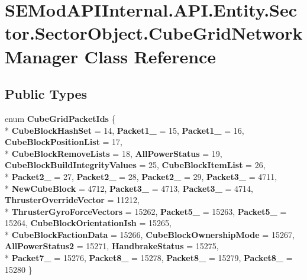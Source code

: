 \hypertarget{class_s_e_mod_a_p_i_internal_1_1_a_p_i_1_1_entity_1_1_sector_1_1_sector_object_1_1_cube_grid_network_manager}{}\section{S\+E\+Mod\+A\+P\+I\+Internal.\+A\+P\+I.\+Entity.\+Sector.\+Sector\+Object.\+Cube\+Grid\+Network\+Manager Class Reference}
\label{class_s_e_mod_a_p_i_internal_1_1_a_p_i_1_1_entity_1_1_sector_1_1_sector_object_1_1_cube_grid_network_manager}
\subsection*{Public Types}
\begin{DoxyCompactItemize}
\item 
\hypertarget{class_s_e_mod_a_p_i_internal_1_1_a_p_i_1_1_entity_1_1_sector_1_1_sector_object_1_1_cube_grid_network_manager_a07ca7bcff0f2ff2d4fb36f4a7c3a887d}{}enum {\bfseries Cube\+Grid\+Packet\+Ids} \{ \\*
{\bfseries Cube\+Block\+Hash\+Set} = 14, 
{\bfseries Packet1\+\_} = 15, 
{\bfseries Packet1\+\_} = 16, 
{\bfseries Cube\+Block\+Position\+List} = 17, 
\\*
{\bfseries Cube\+Block\+Remove\+Lists} = 18, 
{\bfseries All\+Power\+Status} = 19, 
{\bfseries Cube\+Block\+Build\+Integrity\+Values} = 25, 
{\bfseries Cube\+Block\+Item\+List} = 26, 
\\*
{\bfseries Packet2\+\_} = 27, 
{\bfseries Packet2\+\_} = 28, 
{\bfseries Packet2\+\_} = 29, 
{\bfseries Packet3\+\_} = 4711, 
\\*
{\bfseries New\+Cube\+Block} = 4712, 
{\bfseries Packet3\+\_} = 4713, 
{\bfseries Packet3\+\_} = 4714, 
{\bfseries Thruster\+Override\+Vector} = 11212, 
\\*
{\bfseries Thruster\+Gyro\+Force\+Vectors} = 15262, 
{\bfseries Packet5\+\_} = 15263, 
{\bfseries Packet5\+\_} = 15264, 
{\bfseries Cube\+Block\+Orientation\+Ish} = 15265, 
\\*
{\bfseries Cube\+Block\+Faction\+Data} = 15266, 
{\bfseries Cube\+Block\+Ownership\+Mode} = 15267, 
{\bfseries All\+Power\+Status2} = 15271, 
{\bfseries Handbrake\+Status} = 15275, 
\\*
{\bfseries Packet7\+\_} = 15276, 
{\bfseries Packet8\+\_} = 15278, 
{\bfseries Packet8\+\_} = 15279, 
{\bfseries Packet8\+\_} = 15280
 \}\label{class_s_e_mod_a_p_i_internal_1_1_a_p_i_1_1_entity_1_1_sector_1_1_sector_object_1_1_cube_grid_network_manager_a07ca7bcff0f2ff2d4fb36f4a7c3a887d}

\end{DoxyCompactItemize}
